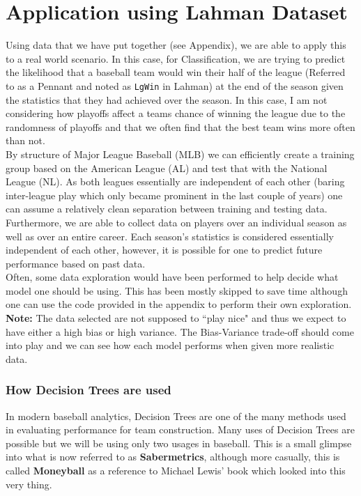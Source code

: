 \documentclass[11pt,a4paper]{report}
\begin{document}
\chapter{Application using Lahman Dataset}
Using data that we have put together (see Appendix), we are able to apply this to a real world scenario.
In this case, for Classification, we are trying to predict the likelihood that a baseball team would win their half of the league (Referred to as a Pennant and noted as \texttt{LgWin} in Lahman) at the end of the season given the statistics that they had achieved over the season. In this case, I am not considering how playoffs affect a teams chance of winning the league due to the randomness of playoffs and that we often find that the best team wins more often than not.
\medskip\\
By structure of Major League Baseball (MLB) we can efficiently create a training group based on the American League (AL) and test that with the National League (NL).
As both leagues essentially are independent of each other (baring inter-league play which only became prominent in the last couple of years) one can assume a relatively clean separation between training and testing data.
\medskip\\ 
Furthermore, we are able to collect data on players over an individual season as well as over an entire career. 
Each season's statistics is considered essentially independent of each other, however, it is possible for one to predict future performance based on past data.
\medskip\\
Often, some data exploration would have been performed to help decide what model one should be using.
This has been mostly skipped to save time although one can use the code provided in the appendix to perform their own exploration.
\medskip\\
\textbf{Note:} The data selected are not supposed to ``play nice" and thus we expect to have either a high bias or high variance. 
The Bias-Variance trade-off should come into play and we can see how each model performs when given more realistic data.

\subsection{How Decision Trees are used}
In modern baseball analytics, Decision Trees are one of the many methods used in evaluating performance for team construction. 
Many uses of Decision Trees are possible but we will be using only two usages in baseball.
This is a small glimpse into what is now referred to as \textbf{Sabermetrics}, although more casually, this is called \textbf{Moneyball} as a reference to Michael Lewis' book which looked into this very thing.
\end{document}
